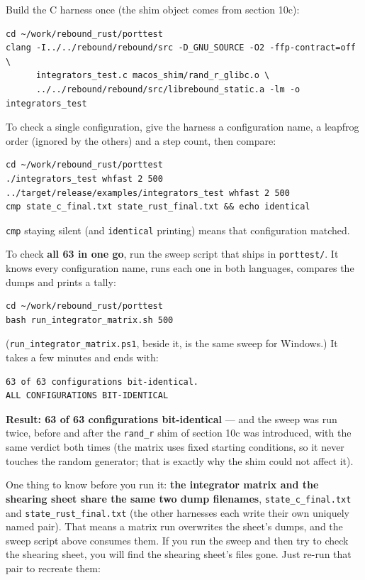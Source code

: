 \documentclass[11pt]{article}
\begin{document}
Build the C harness once (the shim object comes from section 10c):

\begin{lstlisting}
cd ~/work/rebound_rust/porttest
clang -I../../rebound/rebound/src -D_GNU_SOURCE -O2 -ffp-contract=off \
      integrators_test.c macos_shim/rand_r_glibc.o \
      ../../rebound/rebound/src/librebound_static.a -lm -o integrators_test
\end{lstlisting}

To check a single configuration, give the harness a configuration name, a leapfrog order (ignored by the others) and a step count, then compare:

\begin{lstlisting}
cd ~/work/rebound_rust/porttest
./integrators_test whfast 2 500
../target/release/examples/integrators_test whfast 2 500
cmp state_c_final.txt state_rust_final.txt && echo identical
\end{lstlisting}

\texttt{cmp} staying silent (and \texttt{identical} printing) means that configuration matched.

To check \textbf{all 63 in one go}, run the sweep script that ships in \texttt{porttest/}. It knows every configuration name, runs each one in both languages, compares the dumps and prints a tally:

\begin{lstlisting}
cd ~/work/rebound_rust/porttest
bash run_integrator_matrix.sh 500
\end{lstlisting}

(\texttt{run\_integrator\_matrix.ps1}, beside it, is the same sweep for Windows.) It takes a few minutes and ends with:

\begin{lstlisting}
63 of 63 configurations bit-identical.
ALL CONFIGURATIONS BIT-IDENTICAL
\end{lstlisting}

\textbf{Result: 63 of 63 configurations bit-identical} --- and the sweep was run twice, before and after the \texttt{rand\_r} shim of section 10c was introduced, with the same verdict both times (the matrix uses fixed starting conditions, so it never touches the random generator; that is exactly why the shim could not affect it).

One thing to know before you run it: \textbf{the integrator matrix and the shearing sheet share the same two dump filenames}, \texttt{state\_c\_final.txt} and \texttt{state\_rust\_final.txt} (the other harnesses each write their own uniquely named pair). That means a matrix run overwrites the sheet's dumps, and the sweep script above consumes them. If you run the sweep and then try to check the shearing sheet, you will find the shearing sheet's files gone. Just re-run that pair to recreate them:
\end{document}
